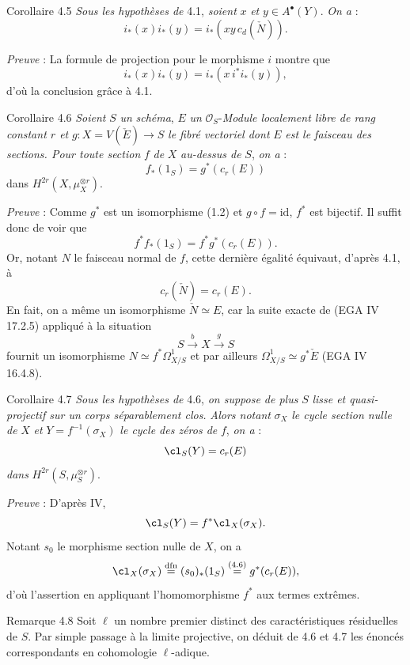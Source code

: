 \begin{statement}{Corollaire 4.5}
\emph{Sous les hypothèses de} 4.1, \emph{soient} $x$ \emph{et} $y\in A^\bullet(Y)$. \emph{On a} :
\[
i_*(x)i_*(y)=i_*(xy\,c_d(\check N)).
\]
\end{statement}

\emph{Preuve} : La formule de projection pour le morphisme $i$ montre que
\[
i_*(x)i_*(y)=i_*(x\,i^*i_*(y)),
\]
d'où la conclusion grâce à 4.1.

\begin{statement}{Corollaire 4.6}
\emph{Soient} $S$ \emph{un} \emph{schéma}, $E$ \emph{un} $\mathcal{O}_S$-\emph{Module localement libre de rang constant $r$ et} $g:X=V(\check E)\to S$ \emph{le fibré vectoriel dont} $E$ \emph{est le faisceau des sections. Pour toute section} $f$ \emph{de} $X$ \emph{au-dessus de} $S$, \emph{on a} :
\[
f_*(1_S)=g^*(c_r(E))
\]
dans $H^{2r}(X,\mu_X^{\otimes r})$.
\end{statement}

\emph{Preuve} : Comme $g^*$ est un isomorphisme (1.2) et $g\circ f=\mathrm{id}$, $f^*$ est bijectif. Il suffit donc de voir que
\[
f^*f_*(1_S)=f^*g^*(c_r(E)).
\]
Or, notant $N$ le faisceau normal de $f$, cette dernière égalité équivaut, d'après 4.1, à
\[
c_r(\check N)=c_r(E).
\]
En fait, on a même un isomorphisme $\check N\simeq E$, car la suite exacte de (EGA IV 17.2.5) appliqué à la situation
\[
S\xrightarrow{b} X\xrightarrow{g} S
\]
fournit un isomorphisme $N\simeq f^*\Omega^1_{X/S}$ et par ailleurs $\Omega^1_{X/S}\simeq g^*\check E$ (EGA IV 16.4.8).

\begin{statement}{Corollaire 4.7}
\emph{Sous les hypothèses de} 4.6, \emph{on suppose de plus} $S$ \emph{lisse et quasi-projectif sur un corps séparablement clos.} \emph{Alors notant} $\sigma_X$ \emph{le cycle section nulle de} $X$ \emph{et} $Y=f^{-1}(\sigma_X)$ \emph{le cycle des zéros de} $f$, \emph{on a} :
\[
\cl_S(Y)=c_r(E)
\]
\emph{dans} $H^{2r}(S,\mu_S^{\otimes r})$.
\end{statement}

\emph{Preuve} : D'après IV,
\[
\cl_S(Y)=f^*\cl_X(\sigma_X).
\]
Notant $s_0$ le morphisme section nulle de $X$, on a
\[
\cl_X(\sigma_X)\stackrel{\mathrm{dfn}}{=}(s_0)_*(1_S)\stackrel{(4.6)}{=}g^*(c_r(E)),
\]
d'où l'assertion en appliquant l'homomorphisme $f^*$ aux termes extrêmes.

\begin{statement}{Remarque 4.8}
Soit $\ell$ un nombre premier distinct des caractéristiques résiduelles de $S$. Par simple passage à la limite projective, on déduit de 4.6 et 4.7 les énoncés correspondants en cohomologie $\ell$-adique.
\end{statement}

